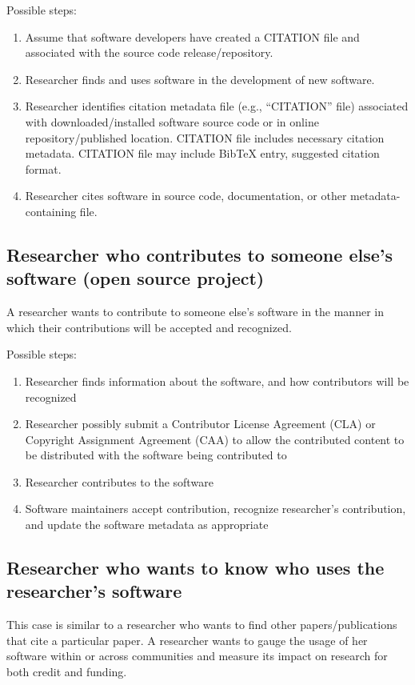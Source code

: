 \documentclass[12pt, oneside]{amsart}
\begin{document}
Possible steps:
\begin{enumerate} \setcounter{enumi}{0}
\item Assume that software developers have created a CITATION file and associated with the source code release/repository.
\item Researcher finds and uses software in the development of new software.
\item Researcher identifies citation metadata file (e.g., ``CITATION'' file) associated with downloaded/installed software source code or in online repository/published location. CITATION file includes necessary citation metadata. CITATION file may include BibTeX entry, suggested citation format.
\item Researcher cites software in source code, documentation, or other metadata-containing file.
\end{enumerate}

\subsection{Researcher who contributes to someone else's software (open source project)}

A researcher wants to contribute to someone else's software in the manner in which their contributions will be accepted and recognized.

Possible steps:
\begin{enumerate}
\item Researcher finds information about the software, and how contributors will be recognized
\item Researcher possibly submit a Contributor License Agreement (CLA) or Copyright Assignment Agreement (CAA) to allow the contributed content to be distributed with the software being contributed to
\item Researcher contributes to the software
\item Software maintainers accept contribution, recognize researcher's contribution, and update the software metadata as appropriate
\end{enumerate}

\subsection{Researcher who wants to know who uses the researcher's software}

This case is similar to a researcher who wants to find other papers/publications that cite a particular paper.
A researcher wants to gauge the usage of her software within or across communities and measure its impact on research for both credit and funding.
\end{document}
